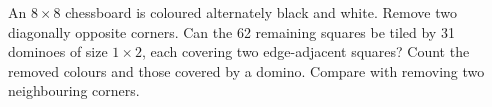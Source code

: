 \documentclass[11pt]{article}
\begin{document}
An \(8 \times  8\) chessboard is coloured alternately black and white. Remove two diagonally opposite corners. Can the 62 remaining squares be tiled by 31 dominoes of size \(1 \times  2\), each covering two edge-adjacent squares? Count the removed colours and those covered by a domino. Compare with removing two neighbouring corners.\par
\vspace{5pt}
\end{document}
